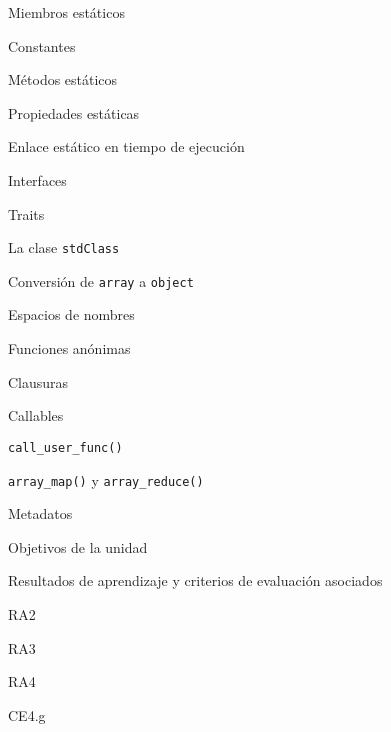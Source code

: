 \begin{longenum}
\begin{longenum}
\begin{longenum}
            \item Miembros estáticos
            \begin{longenum}
                \item Constantes
                \item Métodos estáticos
                \item Propiedades estáticas
                \item Enlace estático en tiempo de ejecución
            \end{longenum}
            \item Interfaces
            \item Traits
            \item La clase \texttt{stdClass}
            \begin{longenum}
                \item Conversión de \texttt{array} a \texttt{object}
            \end{longenum}
        \end{longenum}
        \item Espacios de nombres
        \item Funciones anónimas
        \begin{longenum}
            \item Clausuras
        \end{longenum}
        \item Callables
        \begin{longenum}
            \item \texttt{call\_user\_func()}
            \item \texttt{array\_map()} y \texttt{array\_reduce()}
        \end{longenum}
        \item Metadatos
        \begin{longenum}
            \item Objetivos de la unidad
            \item Resultados de aprendizaje y criterios de evaluación asociados
            \begin{longenum}
                \item RA2
                \item RA3
                \item RA4
                \begin{longenum}
                    \item CE4.g
                \end{longenum}

\end{longenum}
\end{longenum}
\end{longenum}
\end{longenum}

